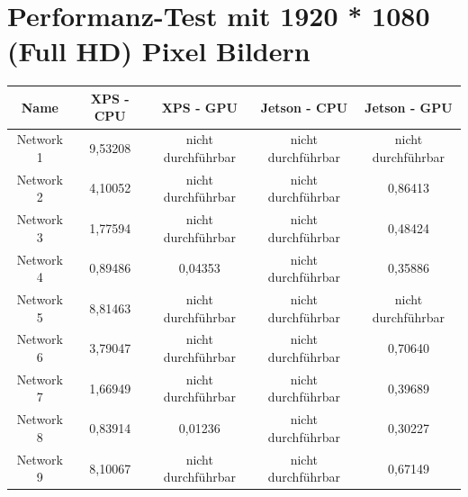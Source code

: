 \section{Performanz-Test mit 1920 * 1080 (Full HD) Pixel Bildern}
\begin{table}[H]
    \centering
    \begin{tabular}{ |c|c|c|c|c| }
        \hline
        \textbf{Name} & \textbf{XPS - CPU} & \textbf{XPS - GPU} & \textbf{Jetson - CPU} & \textbf{Jetson - GPU}   \\ \hline
        Network  1 & 9,53208                                & \textcolor{danger}{nicht durchführbar} & \textcolor{danger}{nicht durchführbar} & \textcolor{danger}{nicht durchführbar} \\ \hline
        Network  2 & 4,10052                                & \textcolor{danger}{nicht durchführbar} & \textcolor{danger}{nicht durchführbar} & 0,86413                                \\ \hline
        Network  3 & 1,77594                                & \textcolor{danger}{nicht durchführbar} & \textcolor{danger}{nicht durchführbar} & 0,48424                                \\ \hline
        Network  4 & 0,89486                                & 0,04353                                & \textcolor{danger}{nicht durchführbar} & 0,35886                                \\ \hline
        Network  5 & 8,81463                                & \textcolor{danger}{nicht durchführbar} & \textcolor{danger}{nicht durchführbar} & \textcolor{danger}{nicht durchführbar} \\ \hline
        Network  6 & 3,79047                                & \textcolor{danger}{nicht durchführbar} & \textcolor{danger}{nicht durchführbar} & 0,70640                                \\ \hline
        Network  7 & 1,66949                                & \textcolor{danger}{nicht durchführbar} & \textcolor{danger}{nicht durchführbar} & 0,39689                                \\ \hline
        Network  8 & 0,83914                                & 0,01236                                & \textcolor{danger}{nicht durchführbar} & 0,30227                                \\ \hline
        Network  9 & 8,10067                                & \textcolor{danger}{nicht durchführbar} & \textcolor{danger}{nicht durchführbar} & 0,67149                                \\ \hline

\end{tabular}
\end{table}
